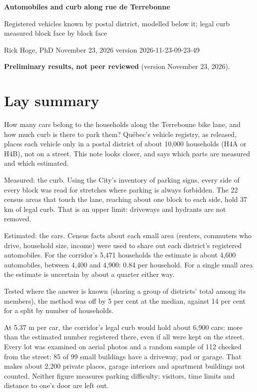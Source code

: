\documentclass[11pt,a4paper]{article}
\newcommand{\docversion}{2026-11-23-09-23-49}
\begin{document}
{\LARGE\bfseries Automobiles and curb along rue de Terrebonne\par}\vspace{0.3em}
{\large Registered vehicles known by postal district, modelled below it; legal curb measured block face by block face\par}\vspace{0.6em}
Rick Hoge, PhD \hfill November 23, 2026 \hfill version \docversion
\begin{center}\colorbox{black!6}{\parbox{0.96\textwidth}{\centering\textbf{Preliminary results, not peer reviewed} (version November 23, 2026).}}\end{center}
\section*{Lay summary}
How many cars belong to the households along the Terrebonne bike lane, and how much curb is there to park them? Québec\textquoteright{}s vehicle registry, as released, places each vehicle only in a postal district of about 10,000 households (H4A or H4B), not on a street. This note looks closer, and says which parts are measured and which estimated.

Measured: the curb. Using the City\textquoteright{}s inventory of parking signs, every side of every block was read for stretches where parking is always forbidden. The 22 census areas that touch the lane, reaching about one block to each side, hold 37 km of legal curb. That is an upper limit: driveways and hydrants are not removed.

Estimated: the cars. Census facts about each small area (renters, commuters who drive, household size, income) were used to share out each district\textquoteright{}s registered automobiles. For the corridor\textquoteright{}s 5,471 households the estimate is about 4,600 automobiles, between 4,400 and 4,900: 0.84 per household. For a single small area the estimate is uncertain by about a quarter either way.

Tested where the answer is known (sharing a group of districts\textquoteright{} total among its members), the method was off by 5 per cent at the median, against 14 per cent for a split by number of households.

At 5.37 m per car, the corridor\textquoteright{}s legal curb would hold about 6,900 cars: more than the estimated number registered there, even if all were kept on the street. Every lot was examined on aerial photos and a random sample of 112 checked from the street: 85 of 99 small buildings have a driveway, pad or garage. That makes about 2,200 private places, garage interiors and apartment buildings not counted. Neither figure measures parking difficulty: visitors, time limits and distance to one\textquoteright{}s door are left out.
\end{document}
